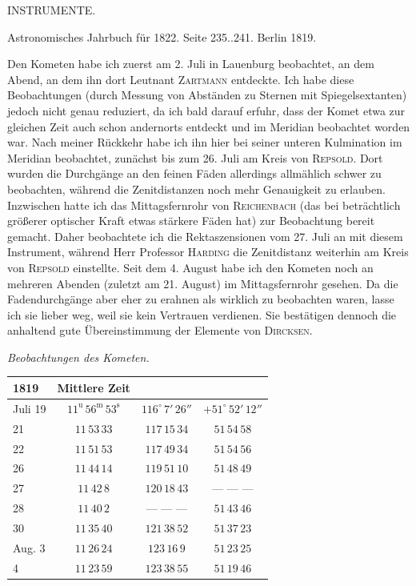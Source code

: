 \clearpage
{}
\hypertarget{native-429-part-lower}{}
\begin{center}{\Large INSTRUMENTE.}\end{center}
\begin{center}
Astronomisches Jahrbuch für 1822. Seite 235..241. Berlin 1819.
\end{center}

\par\indent Den Kometen habe ich zuerst am 2. Juli in Lauenburg beobachtet, an dem Abend, an dem ihn dort Leutnant \textsc{Zartmann} entdeckte. Ich habe diese Beobachtungen (durch Messung von Abständen zu Sternen mit Spiegelsextanten) jedoch nicht genau reduziert, da ich bald darauf erfuhr, dass der Komet etwa zur gleichen Zeit auch schon andernorts entdeckt und im Meridian beobachtet worden war. Nach meiner Rückkehr habe ich ihn hier bei seiner unteren Kulmination im Meridian beobachtet, zunächst bis zum 26. Juli am Kreis von \textsc{Repsold}. Dort wurden die Durchgänge an den feinen Fäden allerdings allmählich schwer zu beobachten, während die Zenitdistanzen noch mehr Genauigkeit zu erlauben. 
Inzwischen hatte ich das Mittagsfernrohr von \textsc{Reichenbach} (das bei beträchtlich größerer optischer Kraft etwas stärkere Fäden hat) zur Beobachtung bereit gemacht. Daher beobachtete ich die Rektaszensionen vom 27. Juli an mit diesem Instrument, während Herr Professor \textsc{Harding} die Zenitdistanz weiterhin am Kreis von \textsc{Repsold} einstellte. Seit dem 4. August habe ich den Kometen noch an mehreren Abenden (zuletzt am 21. August) im Mittagsfernrohr gesehen. Da die Fadendurchgänge aber eher zu erahnen als wirklich zu beobachten waren, lasse ich sie lieber weg, weil sie kein Vertrauen verdienen. Sie bestätigen dennoch die anhaltend gute Übereinstimmung der Elemente von \textsc{Dircksen}.

\begin{center}
\emph{Beobachtungen des Kometen.}
\end{center}

\begin{center}
\begin{tabular}{l|c|c|c}
1819 & Mittlere Zeit & & \\
\hline
Juli 19 & $11^{\mathrm u}\,56^{\mathrm m}\,53^{\mathrm s}$ & $116^\circ\,7'\,26''$ & $+51^\circ\,52'\,12''$ \\
21 & $11\,53\,33$ & $117\,15\,34$ & $51\,54\,58$ \\
22 & $11\,51\,53$ & $117\,49\,34$ & $51\,54\,56$ \\
26 & $11\,44\,14$ & $119\,51\,10$ & $51\,48\,49$ \\
27 & $11\,42\,8$ & $120\,18\,43$ & --- --- --- \\
28 & $11\,40\,2$ & --- --- --- & $51\,43\,46$ \\
30 & $11\,35\,40$ & $121\,38\,52$ & $51\,37\,23$ \\
Aug. 3 & $11\,26\,24$ & $123\,16\,9$ & $51\,23\,25$ \\
4 & $11\,23\,59$ & $123\,38\,55$ & $51\,19\,46$ \\
\end{tabular}
\end{center}

